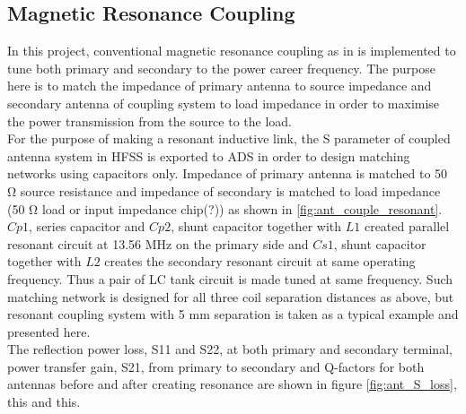\documentclass[12pt,a4paper,UKenglish]{article}
\begin{document}
\subsection{Magnetic Resonance Coupling}

In this project, conventional magnetic resonance coupling as in is implemented to tune both primary and secondary 
to the power career frequency. The purpose here is to match the impedance of primary antenna to source impedance and secondary antenna of 
coupling system to load impedance in order to maximise the power transmission from the source to  the load.  \\


For the purpose of making a resonant inductive link, the S parameter of coupled antenna system in HFSS 
is exported to ADS in order to design matching networks using capacitors only. Impedance of  primary antenna is 
matched to 50 \si{\ohm} source resistance and impedance of secondary is matched to load impedance (50 \si{\ohm} load or input 
impedance chip(?)) as shown in \ref{fig:ant_couple_resonant}. $Cp1$, series capacitor and $Cp2$, shunt capacitor together 
with $L1$ created parallel resonant circuit at 13.56 MHz on the primary side and $Cs1$, shunt capacitor together with $L2$ 
creates the secondary resonant circuit at same operating frequency. Thus a pair of LC tank circuit is made tuned at same 
frequency. Such matching network is designed for all three coil separation distances as above, but resonant coupling system 
with 5 mm separation is taken as a typical example and presented here. \\

The reflection power loss, S11 and S22, at both primary and secondary terminal, power transfer gain, S21, from primary 
to secondary and Q-factors for both antennas before and after creating resonance are shown in figure \ref{fig:ant_S_loss}, 
this and this. \\
\end{document}
